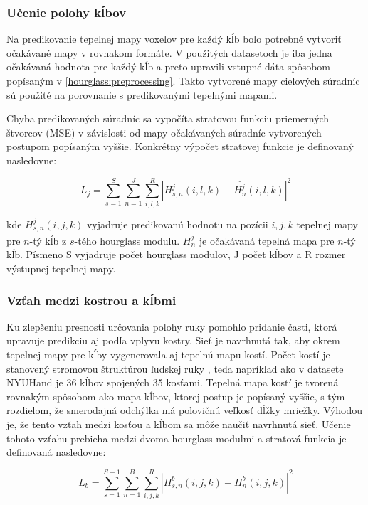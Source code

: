 \subsubsection{Učenie polohy kĺbov}\label{jointLearning}
Na predikovanie tepelnej mapy voxelov pre každý kĺb bolo potrebné vytvoriť očakávané mapy v rovnakom formáte. V použitých datasetoch je iba jedna očakávaná hodnota pre každý kĺb a preto upravili vstupné dáta spôsobom popísaným v \ref{hourglass:preprocessing}. Takto vytvorené mapy cieľových súradníc sú použité na porovnanie s predikovanými tepelnými mapami.

Chyba predikovaných súradníc sa vypočíta stratovou funkciu priemerných štvorcov (MSE) v závislosti od mapy očakávaných súradníc vytvorených postupom popísaným vyššie. Konkrétny výpočet stratovej funkcie je definovaný nasledovne:

\begin{equation}\label{eqn:fuyang_loss_joint}
    L_j = \sum_{s=1}^S{ \sum_{n=1}^J{ \sum_{i,l,k}^R{|H_{s,n}^j(i,l,k) - \overset{\_}{H_n^j}(i,l,k) |^2} } }
\end{equation}

kde $H_{s,n}^j(i,j,k)$ vyjadruje predikovanú hodnotu na pozícii $i,j,k$ tepelnej mapy pre $n$-tý kĺb z $s$-tého hourglass modulu. $\overset{\_}{H_n^j}$ je očakávaná tepelná mapa pre $n$-tý kĺb. Písmeno S vyjadruje počet hourglass modulov, J počet kĺbov a R rozmer výstupnej tepelnej mapy.

\subsubsection{Vzťah medzi kostrou a kĺbmi}\label{bonesLearning}
Ku zlepšeniu presnosti určovania polohy ruky pomohlo pridanie časti, ktorá upravuje predikciu aj podľa vplyvu kostry. Sieť je navrhnutá tak, aby okrem tepelnej mapy pre kĺby vygenerovala aj tepelnú mapu kostí. Počet kostí je stanovený stromovou štruktúrou ľudskej ruky , teda napríklad ako v datasete NYUHand je 36 kĺbov spojených 35 kosťami. Tepelná mapa kostí je tvorená rovnakým spôsobom ako mapa kĺbov, ktorej postup je popísaný vyššie, s tým rozdielom, že smerodajná odchýlka má polovičnú veľkosť dĺžky mriežky. Výhodou je, že tento vzťah medzi kosťou a kĺbom sa môže naučiť navrhnutá sieť. Učenie tohoto vzťahu prebieha medzi dvoma hourglass modulmi a stratová funkcia je definovaná nasledovne:

\begin{equation}\label{eqn:fuyang_loss_bone}
    L_b = \sum_{s=1}^{S-1}{ \sum_{n=1}^B{ \sum_{i,j,k}^R{|H_{s,n}^b(i,j,k) - \overset{\_}{H_n^b}(i,j,k) |^2} } }
\end{equation}

